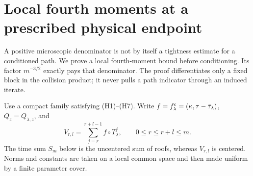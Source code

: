 \section{Local fourth moments at a prescribed physical endpoint}
\label{sec:v36-local-bridge-moments}
A positive microscopic denominator is not by itself a tightness
estimate for a conditioned path. We prove a local fourth-moment bound
before conditioning. Its factor $m^{-3/2}$ exactly pays that denominator.
The proof differentiates only a fixed block in the collision product;
it never pulls a path indicator through an induced iterate.

Use a compact family satisfying \textup{(H1)--(H7)}. Write
$f=f^{\rm c}_\lambda=(\kappa,\tau-\bar\tau_\lambda)$,
$Q_z=Q_{\lambda,z}$, and
\[
 V_{r,l}=\sum_{j=r}^{r+l-1}f\circ T_\lambda^j,
 \qquad 0\le r\le r+l\le m.
\]
The time sum $S_m$ below is the uncentered sum of roofs, whereas
$V_{r,l}$ is centered. Norms and constants are taken on a local common
space and then made uniform by a finite parameter cover.

